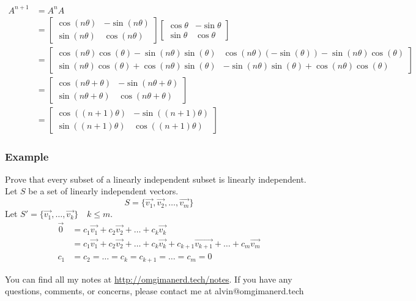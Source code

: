 \documentclass[letterpaper, 12pt]{math}
\begin{document}
\begin{align*}
  A^{n+1} &= A^nA \\
  &= \begin{bmatrix}
    \cos(n\theta) & -\sin(n\theta) \\
    \sin(n\theta) & \cos(n\theta)
  \end{bmatrix}\begin{bmatrix}
    \cos\theta & -\sin\theta \\
    \sin\theta & \cos\theta
  \end{bmatrix} \\
  &= \begin{bmatrix}
    \cos(n\theta)\cos(\theta)-\sin(n\theta)\sin(\theta) &
      \cos(n\theta)(-\sin(\theta))-\sin(n\theta)\cos(\theta) \\
    \sin(n\theta)\cos(\theta)+\cos(n\theta)\sin(\theta) &
      -\sin(n\theta)\sin(\theta)+\cos(n\theta)\cos(\theta)
  \end{bmatrix} \\
  &= \begin{bmatrix}
    \cos(n\theta+\theta) & -\sin(n\theta+\theta) \\
    \sin(n\theta+\theta) & \cos(n\theta+\theta)
  \end{bmatrix} \\
  &= \begin{bmatrix}
    \cos((n+1)\theta) & -\sin((n+1)\theta) \\
    \sin((n+1)\theta) & \cos((n+1)\theta)
  \end{bmatrix}
\end{align*}

\subsubsection*{Example}
Prove that every subset of a linearly independent subset is linearly
independent. Let \( S \) be a set of linearly independent vectors.
\[ S = \{\vec{v_1},\vec{v_2},\dots,\vec{v_m}\} \]
Let \( S' = \{\vec{v_1},\dots,\vec{v_k}\} \quad k\le m \).
\begin{align*}
  \vec{0} &= c_1\vec{v_1}+c_2\vec{v_2}+\dots+c_k\vec{v_k} \\
  &= c_1\vec{v_1}+c_2\vec{v_2}+\dots+c_k\vec{v_k}+
    c_{k+1}\overrightarrow{v_{k+1}}+\dots+c_m\vec{v_m} \\
  c_1 &= c_2 = \dots = c_k = c_{k+1} = \dots = c_m = 0
\end{align*}

\begin{center}
  You can find all my notes at \url{http://omgimanerd.tech/notes}. If you have
  any questions, comments, or concerns, please contact me at
  alvin@omgimanerd.tech
\end{center}
\end{document}
